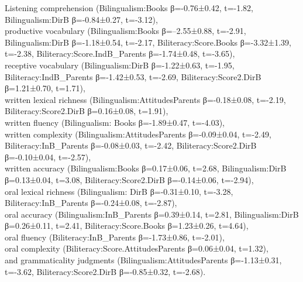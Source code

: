 \documentclass[output=paper,modfonts,nonflat,newtxmath]{langsci/langscibook}
\begin{document}
Listening comprehension (Bilingualism:Books β=-0.76±0.42, t=-1.82, Bilingualism:DirB β=-0.84±0.27, t=-3.12),\\
 productive vocabulary (Bilingualism:Books β=--2.55±0.88, t=-2.91, Bilingualism:DirB β=-1.18±0.54, t=-2.17, Biliteracy:Score.Books β=-3.32±1.39, t=-2.38, Biliteracy:Score.IndB\_Parents β=-1.74±0.48, t=-3.65),\\
 receptive vocabulary (Bilingualism:DirB β=-1.22±0.63, t=-1.95, Biliteracy:IndB\_Parents β=-1.42±0.53, t=-2.69, Biliteracy:Score2.DirB β=1.21±0.70, t=1.71),\\
 written lexical richness (Bilingualism:AttitudesParents β=-0.18±0.08, t=-2.19, Biliteracy:Score2.DirB β=0.16±0.08, t=1.91),\\
 written fluency (Bilingualism: Books β=-1.89±0.47, t=-4.03),\\
 written complexity (Bilingualism:AttitudesParents β=-0.09±0.04, t=-2.49, Biliteracy:InB\_Parents β=-0.08±0.03, t=-2.42, Biliteracy:Score2.DirB β=-0.10±0.04, t=-2.57),\\
 written accuracy (Bilingualism:Books β=0.17±0.06, t=2.68, Bilingualism:DirB β=0.13±0.04, t=3.08, Biliteracy:Score2.DirB β=-0.14±0.06, t=-2.94),\\
 oral lexical richness (Bilingualism: DirB β=-0.31±0.10, t=-3.28, Biliteracy:InB\_Parents β=-0.24±0.08, t=-2.87),\\
 oral accuracy (Bilingualism:InB\_Parents β=0.39±0.14, t=2.81, Bilingualism:DirB β=0.26±0.11, t=2.41, Biliteracy:Score.Books β=1.23±0.26, t=4.64),\\
 oral fluency (Biliteracy:InB\_Parents β=-1.73±0.86, t=-2.01),\\
 oral complexity (Biliteracy:Score.AttitudesParents β=0.06±0.04, t=1.32),\\
 and grammaticality judgments (Bilingualism:AttitudesParents β=-1.13±0.31, t=-3.62, Biliteracy:Score2.DirB β=-0.85±0.32, t=-2.68).


\end{document}

